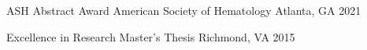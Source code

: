 
\begin{cvhonors}

  \cvhonor
    {ASH Abstract Award} %
    {American Society of Hematology} %
    {Atlanta, GA} %
    {2021} %

  \cvhonor
    {Excellence in Research} %
    {Master's Thesis} %
    {Richmond, VA} %
    {2015} %


\end{cvhonors}

